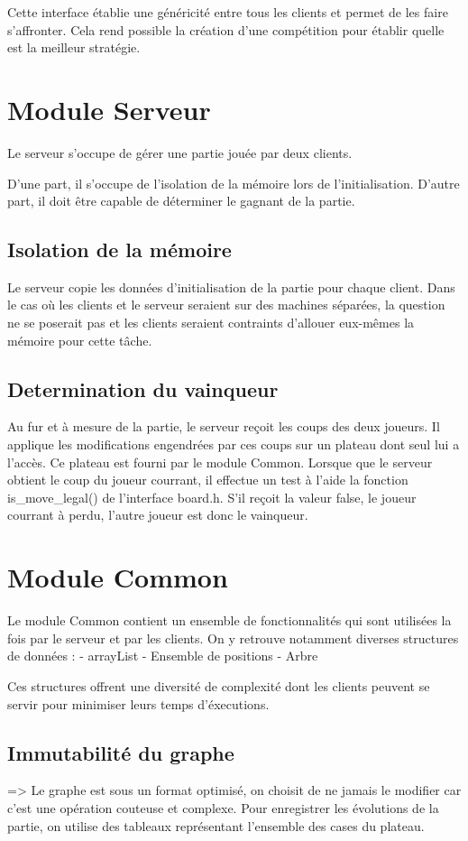 \documentclass{article}
\begin{document}
Cette interface établie une généricité entre tous les clients et permet de les faire s'affronter.
Cela rend possible la création d'une compétition pour établir quelle est 
la meilleur stratégie.

\section{Module Serveur}

Le serveur s'occupe de gérer une partie jouée par deux clients. 

D'une part, il s'occupe de l'isolation de la mémoire lors de l'initialisation.
D'autre part, il doit être capable de déterminer le gagnant de la partie.


\subsection{Isolation de la mémoire}
Le serveur copie les données d'initialisation de la partie pour chaque client.
Dans le cas où les clients et le serveur seraient sur des machines séparées, 
la question ne se poserait pas et les clients seraient contraints
d'allouer eux-mêmes la mémoire pour cette tâche.

\subsection{Determination du vainqueur}
Au fur et à mesure de la partie, le serveur reçoit les coups des deux joueurs.
Il applique les modifications engendrées par ces coups sur un plateau dont seul lui a l'accès.
Ce plateau est fourni par le module Common. Lorsque que le serveur obtient le coup 
du joueur courrant, il effectue un test à l'aide la fonction is_move_legal() de l'interface board.h.
S'il reçoit la valeur false, le joueur courrant à perdu, l'autre joueur est donc le vainqueur.


\section{Module Common}
Le module Common contient un ensemble de fonctionnalités qui sont 
utilisées la fois par le serveur et par les clients. On y retrouve 
notamment diverses structures de données :
- arrayList
- Ensemble de positions
- Arbre

Ces structures offrent une diversité de complexité dont les clients 
peuvent se servir pour minimiser leurs temps d'éxecutions.

\subsection{Immutabilité du graphe}
=> Le graphe est sous un format optimisé, on choisit de ne jamais 
le modifier car c'est une opération couteuse et complexe. Pour 
enregistrer les évolutions de la partie, on utilise des 
tableaux représentant l'ensemble des cases du plateau.
\end{document}
